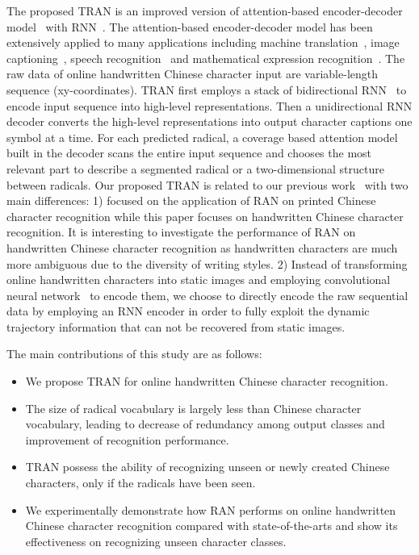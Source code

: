 \documentclass[a4paper,conference]{IEEEtran}
\begin{document}
The proposed TRAN is an improved version of attention-based encoder-decoder model~\cite{bahdanau2014neural} with RNN~\cite{graves2012supervised}. The attention-based encoder-decoder model has been extensively applied to many applications including machine translation~\cite{cho2014learning,luong2015effective}, image captioning~\cite{xu2015show,vinyals2015show}, speech recognition~\cite{bahdanau2016end} and mathematical expression recognition~\cite{zhang2017watch,zhang2017multi}. The raw data of online handwritten Chinese character input are variable-length sequence (xy-coordinates). TRAN first employs a stack of bidirectional RNN~\cite{graves2013speech} to encode input sequence into high-level representations. Then a unidirectional RNN decoder converts the high-level representations into output character captions one symbol at a time. For each predicted radical, a coverage based attention model~\cite{zhang2017gru} built in the decoder scans the entire input sequence and chooses the most relevant part to describe a segmented radical or a two-dimensional structure between radicals. Our proposed TRAN is related to our previous work~\cite{zhang2017ran} with two main differences: 1) \cite{zhang2017ran} focused on the application of RAN on printed Chinese character recognition while this paper focuses on handwritten Chinese character recognition. It is interesting to investigate the performance of RAN on handwritten Chinese character recognition as handwritten characters are much more ambiguous due to the diversity of writing styles. 2) Instead of transforming online handwritten characters into static images and employing convolutional neural network~\cite{krizhevsky2012imagenet} to encode them, we choose to directly encode the raw sequential data by employing an RNN encoder in order to fully exploit the dynamic trajectory information that can not be recovered from static images.

The main contributions of this study are as follows:
\begin{itemize}
  \item We propose TRAN for online handwritten Chinese character recognition.
  \item The size of radical vocabulary is largely less than Chinese character vocabulary, leading to decrease of redundancy among output classes and improvement of recognition performance.
  \item TRAN possess the ability of recognizing unseen or newly created Chinese characters, only if the radicals have been seen.
  \item We experimentally demonstrate how RAN performs on online handwritten Chinese character recognition compared with state-of-the-arts and show its effectiveness on recognizing unseen character classes.
\end{itemize}
\end{document}
